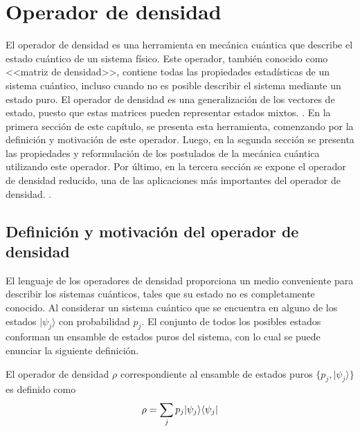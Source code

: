 \chapter{Operador de densidad}\label{OpDensidad}
El operador de densidad es una herramienta en mecánica cuántica que describe el
estado cuántico de un sistema físico. Este operador, también conocido como
<<matriz de densidad>>, contiene todas las propiedades estadísticas de un sistema cuántico, incluso cuando no es posible describir el sistema mediante un estado puro. El operador de densidad es una generalización de los vectores de estado, puesto que estas matrices pueden representar estados mixtos. .  
En la primera sección de este capítulo, se presenta esta herramienta, comenzando por la definición y motivación de este operador. Luego, en la segunda sección  se presenta las propiedades y reformulación de los postulados de la mecánica cuántica utilizando este operador. Por último, en la tercera sección se expone el operador de densidad reducido, una de las aplicaciones más importantes del operador de densidad.
. 


\section{Definición y motivación  del operador de densidad} %
El lenguaje de los operadores de densidad proporciona un  medio conveniente
para describir los sistemas cuánticos, tales que su estado no es completamente
conocido. Al considerar un sistema cuántico que se encuentra en alguno de los
estados $|\psi_j \rangle $ con probabilidad $p_j$. El conjunto de todos los
posibles estados conforman un ensamble de estados puros del sistema, con lo
cual se puede enunciar la siguiente definición. 

\begin{definition} El operador de densidad
$\rho$ correspondiente al ensamble de estados puros $\{p_j,|\psi_j \rangle \}$
es definido como {\cite{wilde2011classical}}
  	\begin{equation}{\label{defdensityoperator}}
  		\rho=\sum_{j}p_j|\psi_j\rangle \langle \psi_j|
  	\end{equation}
\end{definition}
  	

